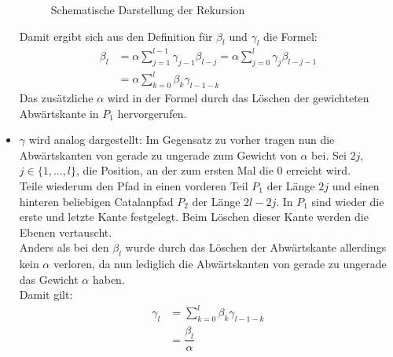 \documentclass[a4paper, 11pt]{scrreprt}
\begin{document}
\begin{itemize}
\begin{figure}[htpb]
	\caption{Schematische Darstellung der Rekursion}
\end{figure}
Damit ergibt sich aus den Definition für \(\beta_l\) und \(\gamma_l\) die Formel:
\begin{equation}
	\begin{split}
		\beta_l &= \alpha\sum_{j=1}^{l-1}\gamma_{j-1}\beta_{l-j} = \alpha\sum_{j=0}^l \gamma_j\beta_{l-j-1}\\
		&=\alpha\sum_{k=0}^l \beta_k\gamma_{l-1-k}
	\end{split}
\end{equation}
Das zusätzliche \(\alpha\) wird in der Formel durch das Löschen der gewichteten Abwärtskante in \(P_1\) hervorgerufen.\\


\item $ \gamma $ wird analog dargestellt: Im Gegensatz zu vorher tragen nun die Abwärtskanten von gerade zu ungerade zum Gewicht von $ \alpha $ bei. Sei \(2j\), \(j\in\{1,...,l\}\), die Position, an der zum ersten Mal die \(0\) erreicht wird. \\
Teile wiederum den Pfad in einen vorderen Teil \(P_1\) der Länge \(2j\) und einen hinteren beliebigen Catalanpfad \(P_2\) der Länge \(2l-2j\). In \(P_1\) sind wieder die erste und letzte Kante festgelegt. Beim Löschen dieser Kante werden die Ebenen vertauscht. \\
Anders als bei den $ \beta_l $ wurde durch das Löschen der Abwärtskante allerdings kein $ \alpha $ verloren, da nun lediglich die Abwärtskanten von gerade zu ungerade das Gewicht $ \alpha $ haben.\\ 
Damit gilt: 
\begin{equation}
	\begin{split}
		\gamma_l &=\sum_{k=0}^l \beta_k\gamma_{l-1-k} \\
		&= \dfrac{\beta_l}{\alpha}
	\end{split}
\end{equation}\\

\end{itemize}
\end{document}
